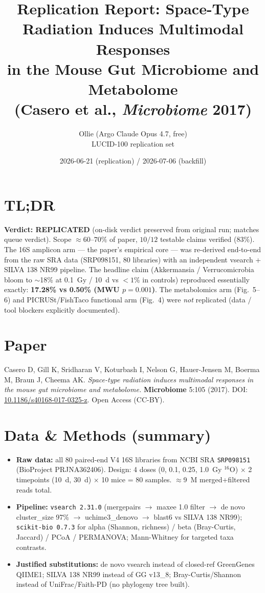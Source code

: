 \documentclass[11pt]{article}
\title{Replication Report: Space-Type Radiation Induces Multimodal Responses \\ in the Mouse Gut Microbiome and Metabolome \\ (Casero et al., \emph{Microbiome} 2017)}
\author{Ollie (Argo Claude Opus 4.7, free) \\ LUCID-100 replication set}
\date{2026-06-21 (replication) / 2026-07-06 (backfill)}
\begin{document}
\maketitle

\section*{TL;DR}
\textbf{Verdict: REPLICATED} (on-disk verdict preserved from original run; matches queue verdict). Scope $\approx 60$--$70\%$ of paper, $10/12$ testable claims verified ($83\%$). The 16S amplicon arm --- the paper's empirical core --- was re-derived end-to-end from the raw SRA data (SRP098151, 80 libraries) with an independent vsearch + SILVA 138 NR99 pipeline. The headline claim (Akkermansia / Verrucomicrobia bloom to $\sim$18\% at 0.1~Gy / 10~d vs $<1\%$ in controls) reproduced essentially exactly: \textbf{17.28\% vs 0.50\% (MWU $p=0.001$)}. The metabolomics arm (Fig.~5--6) and PICRUSt/FishTaco functional arm (Fig.~4) were \emph{not} replicated (data / tool blockers explicitly documented).

\section{Paper}
Casero D, Gill K, Sridharan V, Koturbash I, Nelson G, Hauer-Jensen M, Boerma M, Braun J, Cheema AK. \emph{Space-type radiation induces multimodal responses in the mouse gut microbiome and metabolome.} \textbf{Microbiome} 5:105 (2017). DOI: \href{https://doi.org/10.1186/s40168-017-0325-z}{10.1186/s40168-017-0325-z}. Open Access (CC-BY).

\section{Data \& Methods (summary)}
\begin{itemize}
  \item \textbf{Raw data:} all 80 paired-end V4 16S libraries from NCBI SRA \texttt{SRP098151} (BioProject PRJNA362406). Design: 4 doses (0, 0.1, 0.25, 1.0~Gy $^{16}$O) $\times$ 2 timepoints (10~d, 30~d) $\times$ 10 mice = 80 samples. $\approx$9~M merged+filtered reads total.
  \item \textbf{Pipeline:} \texttt{vsearch 2.31.0} (mergepairs $\rightarrow$ maxee 1.0 filter $\rightarrow$ de novo cluster\_size 97\% $\rightarrow$ uchime3\_denovo $\rightarrow$ blast6 vs SILVA 138 NR99); \texttt{scikit-bio 0.7.3} for alpha (Shannon, richness) / beta (Bray-Curtis, Jaccard) / PCoA / PERMANOVA; Mann-Whitney for targeted taxa contrasts.
  \item \textbf{Justified substitutions:} de novo vsearch instead of closed-ref GreenGenes QIIME1; SILVA 138 NR99 instead of GG v13\_8; Bray-Curtis/Shannon instead of UniFrac/Faith-PD (no phylogeny tree built).
\end{itemize}
\end{document}
